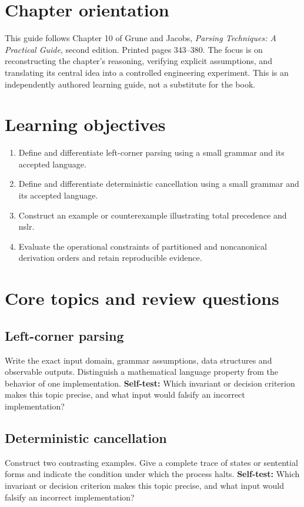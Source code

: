 \documentclass[11pt,letterpaper]{article}
\begin{document}
\makedoctitle\makedocsummary
\tableofcontents\clearpage
\section{Chapter orientation}
This guide follows Chapter 10 of Grune and Jacobs, \emph{Parsing Techniques: A Practical Guide}, second edition. Printed pages 343--380. The focus is on reconstructing the chapter's reasoning, verifying explicit assumptions, and translating its central idea into a controlled engineering experiment. This is an independently authored learning guide, not a substitute for the book.
\section{Learning objectives}
\begin{enumerate}
\item Define and differentiate left-corner parsing using a small grammar and its accepted language.
\item Define and differentiate deterministic cancellation using a small grammar and its accepted language.
\item Construct an example or counterexample illustrating total precedence and nslr.
\item Evaluate the operational constraints of partitioned and noncanonical derivation orders and retain reproducible evidence.
\end{enumerate}
\section{Core topics and review questions}
\subsection{Left-corner parsing}
Write the exact input domain, grammar assumptions, data structures and observable outputs. Distinguish a mathematical language property from the behavior of one implementation.
\textbf{Self-test:} Which invariant or decision criterion makes this topic precise, and what input would falsify an incorrect implementation?
\subsection{Deterministic cancellation}
Construct two contrasting examples. Give a complete trace of states or sentential forms and indicate the condition under which the process halts.
\textbf{Self-test:} Which invariant or decision criterion makes this topic precise, and what input would falsify an incorrect implementation?
\end{document}
